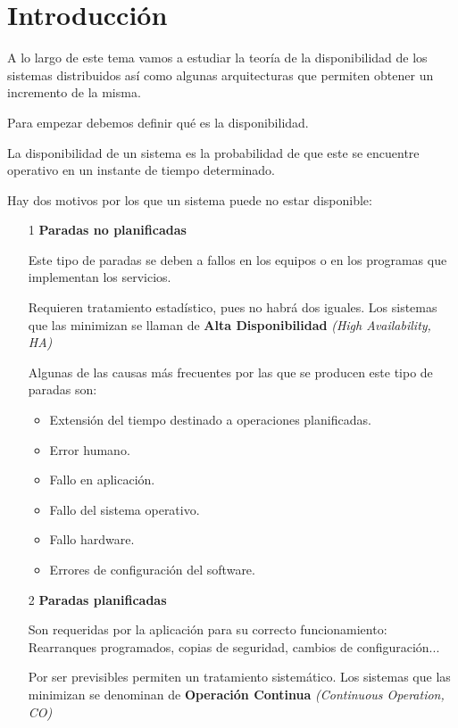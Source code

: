 \section{Introducción}
A lo largo de este tema vamos a estudiar la teoría de la disponibilidad de los sistemas distribuidos así como algunas arquitecturas que permiten obtener un incremento de la misma.

Para empezar debemos definir qué es la disponibilidad.

\begin{defn}[Disponibilidad]
La disponibilidad de un sistema es la probabilidad de que este se encuentre operativo en un instante de tiempo determinado.
\end{defn}

Hay dos motivos por los que un sistema puede no estar disponible:
\begin{enumerate}
\item[1] \textbf{Paradas no planificadas}

Este tipo de paradas se deben a fallos en los equipos o en los programas que implementan los servicios.

Requieren tratamiento estadístico, pues no habrá dos iguales. Los sistemas que las minimizan se llaman de \textbf{Alta Disponibilidad} \textit{(High Availability, HA)} 


Algunas de las causas más frecuentes por las que se producen este tipo de paradas son:

\begin{itemize}
\item Extensión del tiempo destinado a operaciones planificadas.
\item Error humano.
\item Fallo en aplicación.
\item Fallo del sistema operativo.
\item Fallo hardware.
\item Errores de configuración del software.
\end{itemize}

\item[2] \textbf{Paradas planificadas}

Son requeridas por la aplicación para su correcto funcionamiento: Rearranques programados, copias de seguridad, cambios de configuración...

Por ser previsibles permiten un tratamiento sistemático. Los sistemas que las minimizan se denominan de \textbf{Operación Continua} \textit{(Continuous Operation, CO)}  


\end{enumerate}
